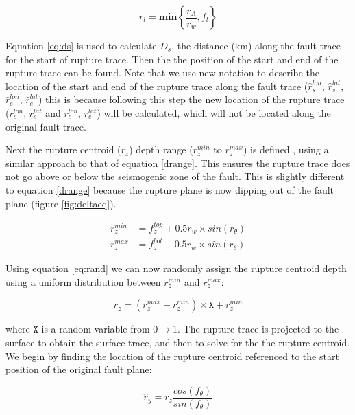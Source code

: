 \begin{equation}
r_l = \mathbf{min}\left\{\frac{r_A}{r_w}, f_l\right\}
\end{equation}

Equation \ref{eq:ds} is used to calculate $D_s$, the distance (km) along the fault trace for the start of rupture trace. Then the the position 
of the start and end of the rupture trace can be found. Note that we use new notation to describe the location of the start and end of the rupture trace along the 
fault trace ($\hat{r}_s^{lon}$, $\hat{r}_s^{lat}$, $\hat{r}_e^{lon}$, $\hat{r}_e^{lat}$) this is because following this step the new location of the rupture 
trace ($r_s^{lon}$, $r_s^{lat}$ and $r_e^{lon}$, $r_e^{lat}$) will be calculated, which will not be located along the original fault trace. 


Next the rupture centroid ($r_z$) depth range ($r_z^{min}$ to $r_z^{max}$) is defined , using a similar approach to that of equation \ref{drange}. This ensures 
the rupture trace does not go above or below the seismogenic zone of the fault. This is slightly different to equation \ref{drange} because the rupture 
plane is now dipping out of the fault plane (figure \ref{fig:deltaeq}).

\begin{subequations} \label{drange2}
\begin{align}
r_z^{min} & = f_z^{top} + 0.5r_w  \times sin(r_\theta)    \\
r_z^{max} & = f_z^{bot} - 0.5r_w  \times sin(r_\theta)  
\end{align}
\end{subequations}

Using equation \ref{eq:rand} we can now randomly assign the rupture centroid depth using a uniform distribution 
between $r_z^{min}$ and $r_z^{max}$:

\begin{equation}
r_z = ( r_z^{max}-r_z^{min} ) \times  \mathtt{X} +   r_z^{min}
\end{equation}

where $\mathtt{X}$ is a random variable from 0$\rightarrow$1. The rupture trace is projected to the surface to obtain the 
surface trace, and then to solve for the the rupture centroid. 
We begin by finding the location of the rupture centroid referenced to the start position of the original fault plane:

\begin{equation}\label{eq:ry}
\hat{r}_y = r_z  \frac{cos(f_\theta)}{sin(f_\theta)}
\end{equation}

